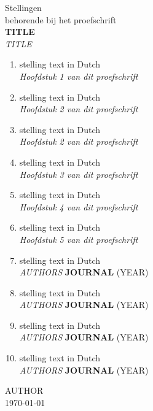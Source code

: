 \documentclass[11pt]{article}
\begin{document}
\pagestyle{empty}
\begin{center}
{\Huge Stellingen}\\[1cm]
{\Large behorende bij het proefschrift}\\[0.5cm]
{\Large \textbf{TITLE}} \\
{\Large \emph{TITLE}}\\[1cm]
\begin{enumerate}
 \setlength{\itemsep}{10pt}
  \item stelling text in Dutch \\
  \hfill \emph{Hoofdstuk 1 van dit proefschrift}\\
  \item stelling text in Dutch \\
  \hfill \emph{Hoofdstuk 2 van dit proefschrift}\\
  \item stelling text in Dutch \\
  \hfill \emph{Hoofdstuk 2 van dit proefschrift}\\
  \item stelling text in Dutch \\
  \hfill \emph{Hoofdstuk 3 van dit proefschrift}\\
  \item stelling text in Dutch \\
  \hfill \emph{Hoofdstuk 4 van dit proefschrift}\\
  \item stelling text in Dutch \\
  \hfill \emph{Hoofdstuk 5 van dit proefschrift}\\

\newpage
  \item stelling text in Dutch \\
  \hfill \emph{AUTHORS} \textbf{JOURNAL} (YEAR)\\
  \item stelling text in Dutch \\
  \hfill \emph{AUTHORS} \textbf{JOURNAL} (YEAR)\\
    \item stelling text in Dutch \\
  \hfill \emph{AUTHORS} \textbf{JOURNAL} (YEAR)\\
    \item stelling text in Dutch \\
  \hfill \emph{AUTHORS} \textbf{JOURNAL} (YEAR)\\
\end{enumerate}
\end{center}

\vfill
\flushright
  AUTHOR\\
  \today
\end{document}

